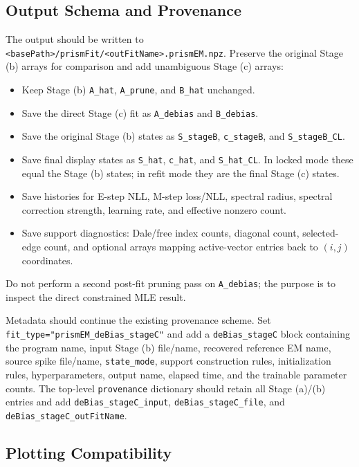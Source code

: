 \documentclass[11pt]{article}
\begin{document}
\subsection{Output Schema and Provenance}

The output should be written to
\texttt{<basePath>/prismFit/<outFitName>.prismEM.npz}. Preserve the original
Stage (b) arrays for comparison and add unambiguous Stage (c) arrays:
\begin{itemize}
    \item Keep Stage (b) \texttt{A\_hat}, \texttt{A\_prune}, and
    \texttt{B\_hat} unchanged.
    \item Save the direct Stage (c) fit as \texttt{A\_debias} and
    \texttt{B\_debias}.
    \item Save the original Stage (b) states as \texttt{S\_stageB},
    \texttt{c\_stageB}, and \texttt{S\_stageB\_CL}.
    \item Save final display states as \texttt{S\_hat}, \texttt{c\_hat}, and
    \texttt{S\_hat\_CL}. In locked mode these equal the Stage (b) states; in
    refit mode they are the final Stage (c) states.
    \item Save histories for E-step NLL, M-step loss/NLL, spectral radius,
    spectral correction strength, learning rate, and effective nonzero count.
    \item Save support diagnostics: Dale/free index counts, diagonal count,
    selected-edge count, and optional arrays mapping active-vector entries
    back to $(i,j)$ coordinates.
\end{itemize}
Do not perform a second post-fit pruning pass on \texttt{A\_debias}; the
purpose is to inspect the direct constrained MLE result.

Metadata should continue the existing provenance scheme. Set
\texttt{fit\_type="prismEM\_deBias\_stageC"} and add a
\texttt{deBias\_stageC} block containing the program name, input Stage (b)
file/name, recovered reference EM name, source spike file/name,
\texttt{state\_mode}, support construction rules, initialization rules,
hyperparameters, output name, elapsed time, and the trainable parameter
counts. The top-level \texttt{provenance} dictionary should retain all
Stage (a)/(b) entries and add \texttt{deBias\_stageC\_input},
\texttt{deBias\_stageC\_file}, and \texttt{deBias\_stageC\_outFitName}.

\subsection{Plotting Compatibility}
\end{document}
